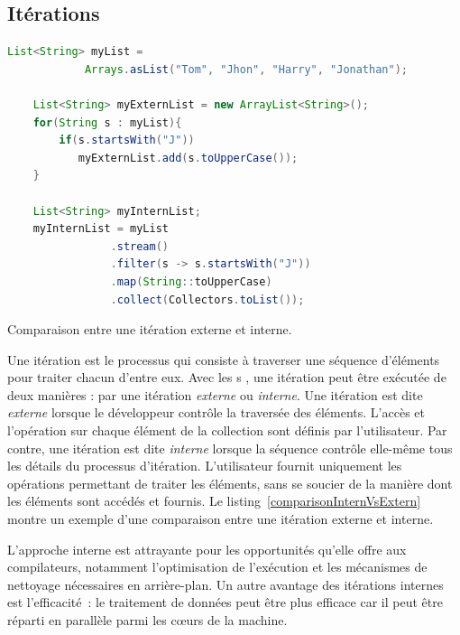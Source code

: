 \subsection{It\'erations}


\begin{Listing}[tbp]
\begin{lstlisting}[language=java]
    List<String> myList =
            Arrays.asList("Tom", "Jhon", "Harry", "Jonathan");

    List<String> myExternList = new ArrayList<String>();
    for(String s : myList){
        if(s.startsWith("J"))
           myExternList.add(s.toUpperCase());
    }
        
    List<String> myInternList;
    myInternList = myList
                .stream()
                .filter(s -> s.startsWith("J"))
                .map(String::toUpperCase)
                .collect(Collectors.toList()); 
\end{lstlisting}
\caption{Comparaison entre une it\'eration externe et interne.}
\label{comparisonInternVsExtern}
\end{Listing}


Une it\'eration est le processus qui consiste \`a traverser une s\'equence d'\'el\'ements pour traiter chacun d'entre eux. Avec les s , une it\'eration peut \^etre ex\'ecut\'ee de deux mani\`eres : par une it\'eration \emph{externe} ou \emph{interne}. Une it\'eration est dite \emph{externe} lorsque le d\'eveloppeur contr\^ole la travers\'ee des \'el\'ements.  L'acc\`es et l'op\'eration sur chaque \'el\'ement de la collection sont d\'efinis par l'utilisateur. Par contre, une it\'eration est dite \emph{interne} lorsque la s\'equence contr\^ole elle-m\^eme tous les d\'etails du processus d'it\'eration. L'utilisateur fournit uniquement les op\'erations permettant de traiter les \'el\'ements, sans se soucier de la mani\`ere dont les \'el\'ements sont acc\'ed\'es et fournis. Le listing~\ref{comparisonInternVsExtern} montre un exemple d’une comparaison entre une itération externe et interne. 


L'approche interne est attrayante pour les opportunit\'es qu'elle offre aux compilateurs, notamment l'optimisation de l'exécution et les m\'ecanismes de nettoyage n\'ecessaires en arri\`ere-plan. Un autre avantage des it\'erations internes est l'efficacit\'e~: le traitement de donn\'ees peut \^etre plus efficace car il peut \^etre r\'eparti en parall\`ele parmi les cœurs de la machine.



